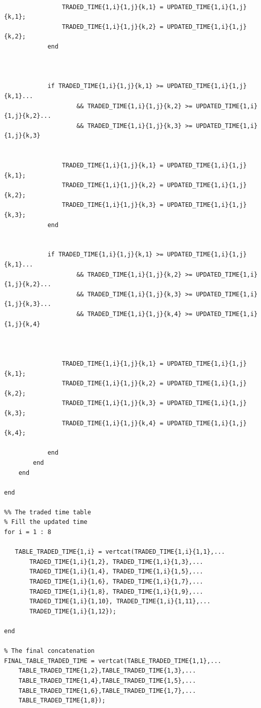 \documentclass{DissertateUSU}
\begin{document}
\begin{verbatim}
                
                TRADED_TIME{1,i}{1,j}{k,1} = UPDATED_TIME{1,i}{1,j}{k,1};
                TRADED_TIME{1,i}{1,j}{k,2} = UPDATED_TIME{1,i}{1,j}{k,2};
            end
                
                
                
            if TRADED_TIME{1,i}{1,j}{k,1} >= UPDATED_TIME{1,i}{1,j}{k,1}...
                    && TRADED_TIME{1,i}{1,j}{k,2} >= UPDATED_TIME{1,i}{1,j}{k,2}...
                    && TRADED_TIME{1,i}{1,j}{k,3} >= UPDATED_TIME{1,i}{1,j}{k,3}
                
                
                TRADED_TIME{1,i}{1,j}{k,1} = UPDATED_TIME{1,i}{1,j}{k,1};
                TRADED_TIME{1,i}{1,j}{k,2} = UPDATED_TIME{1,i}{1,j}{k,2};
                TRADED_TIME{1,i}{1,j}{k,3} = UPDATED_TIME{1,i}{1,j}{k,3};
            end
                
                
            if TRADED_TIME{1,i}{1,j}{k,1} >= UPDATED_TIME{1,i}{1,j}{k,1}...
                    && TRADED_TIME{1,i}{1,j}{k,2} >= UPDATED_TIME{1,i}{1,j}{k,2}...
                    && TRADED_TIME{1,i}{1,j}{k,3} >= UPDATED_TIME{1,i}{1,j}{k,3}...
                    && TRADED_TIME{1,i}{1,j}{k,4} >= UPDATED_TIME{1,i}{1,j}{k,4}
                
                
                
                TRADED_TIME{1,i}{1,j}{k,1} = UPDATED_TIME{1,i}{1,j}{k,1};
                TRADED_TIME{1,i}{1,j}{k,2} = UPDATED_TIME{1,i}{1,j}{k,2};
                TRADED_TIME{1,i}{1,j}{k,3} = UPDATED_TIME{1,i}{1,j}{k,3};
                TRADED_TIME{1,i}{1,j}{k,4} = UPDATED_TIME{1,i}{1,j}{k,4};
                
            end
        end
    end
    
end

%% The traded time table
% Fill the updated time
for i = 1 : 8
    
   TABLE_TRADED_TIME{1,i} = vertcat(TRADED_TIME{1,i}{1,1},...
       TRADED_TIME{1,i}{1,2}, TRADED_TIME{1,i}{1,3},...
       TRADED_TIME{1,i}{1,4}, TRADED_TIME{1,i}{1,5},...
       TRADED_TIME{1,i}{1,6}, TRADED_TIME{1,i}{1,7},...
       TRADED_TIME{1,i}{1,8}, TRADED_TIME{1,i}{1,9},...
       TRADED_TIME{1,i}{1,10}, TRADED_TIME{1,i}{1,11},...
       TRADED_TIME{1,i}{1,12});
    
end

% The final concatenation
FINAL_TABLE_TRADED_TIME = vertcat(TABLE_TRADED_TIME{1,1},...
    TABLE_TRADED_TIME{1,2},TABLE_TRADED_TIME{1,3},...
    TABLE_TRADED_TIME{1,4},TABLE_TRADED_TIME{1,5},...
    TABLE_TRADED_TIME{1,6},TABLE_TRADED_TIME{1,7},...
    TABLE_TRADED_TIME{1,8});



\end{verbatim}
\end{document}
